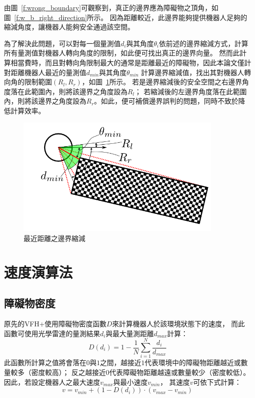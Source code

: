 由圖~\ref{f:wrong_boundary}可觀察到，真正的邊界應為障礙物之頂角，如圖~\ref{f:w_b_right_direction}所示。
因為距離較近，此邊界能夠提供機器人足夠的縮減角度，讓機器人能夠安全通過該空間。

為了解決此問題，可以對每一個量測值$d_i$與其角度$\theta_i$依前述的邊界縮減方式，計算所有量測值對機器人轉向角度的限制，如此便可找出真正的邊界向量。
然而此計算相當費時，而且對轉向角限制最大的通常是距離最近的障礙物，因此本論文僅計對距離機器人最近的量測值$d_{min}$與其角度$\theta_{min}$
計算邊界縮減值，找出其對機器人轉向角的限制範圍$(R_l,R_r)$，如圖~\ref{f:closest_boundary}所示。
若是邊界縮減後的安全空間之右邊界角度落在此範圍內，則將該邊界之角度設為$R_l$；
若縮減後的左邊界角度落在此範圍內，則將該邊界之角度設為$R_r$。如此，便可補償邊界誤判的問題，同時不致於降低計算效率。

\begin{figure}
	\centering
	\includegraphics[width=0.9\textwidth]{figures/algorithm/closest_boundary}
	\caption{最近距離之邊界縮減}
	\label{f:closest_boundary}
\end{figure}

\section{速度演算法}
\label{sec:speed_algorithm}
\subsection{障礙物密度}
原先的VFH+使用障礙物密度函數$D$來計算機器人於該環境狀態下的速度，
而此函數可使用光學雷達的量測結果$d_i$與最大量測距離$d_{max}$計算：
\begin{equation}
	D(d_i) = 1 - \frac{1}{N}\sum_{i=1}^{N}{\frac{d_i}{d_{max}}}
\end{equation}
此函數所計算之值將會落在$0$與$1$之間，越接近$1$代表環境中的障礙物距離越近或數量較多（密度較高）；
反之越接近$0$代表障礙物距離越遠或數量較少（密度較低）。因此，若設定機器人之最大速度$v_{max}$與最小速度$v_{min}$，
其速度$v$可依下式計算：
\begin{equation}
	v = v_{min} + (1-D(d_i)) \cdot (v_{max} - v_{min})
\end{equation}

